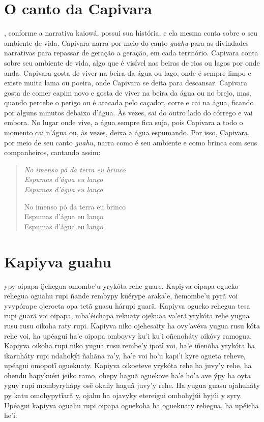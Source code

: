 \chapter{O canto da Capivara}

, conforme a narrativa kaiowá, possui sua história, e ela mesma
conta sobre o seu ambiente de vida. Capivara narra por meio do canto
\emph{guahu} para as divindades narrativas para repassar de geração a
geração, em cada território. Capivara conta sobre seu ambiente de vida,
algo que é visível nas beiras de rios ou lagos por onde anda. Capivara
gosta de viver na beira da água ou lago, onde é sempre limpo e existe
muita lama ou poeira, onde Capivara se deita para descansar. Capivara
gosta de comer capim novo e gosta de viver na beira da água ou no brejo,
mas, quando percebe o perigo ou é atacada pelo caçador, corre e cai na
água, ficando por alguns minutos debaixo d'água. Às vezes, sai do outro
lado do córrego e vai embora. No lugar onde vive, a água sempre fica
suja, pois Capivara a todo o momento cai n'água ou, às vezes, deixa a
água espumando. Por isso, Capivara, por meio de seu canto \emph{guahu},
narra como é seu ambiente e como brinca com seus companheiros, cantando
assim:

\begin{verse}
\itshape
No imenso pó da terra eu brinco\\
Espumas d'água eu lanço\\
Espumas d'água eu lanço

No imenso pó da terra eu brinco\\
Espumas d'água eu lanço\\
Espumas d'água eu lanço
\end{verse}

\chapter{Kapiyva guahu}

 ypy oipapa ijehegua omombe'u yrykóta rehe guare. Kapiyva oipapa
ogueko rehegua oguahu rupi ñande rembypy kuérype araka'e, ñemombe'u pyrã
voi yvypórape ojeroeta opa tetã guasu hárupi guarã. Kapiyva ogueko
rehegua tesa rupi guarã voi oipapa, mba'éichapa rekuaty ojekuaa va'erã
yrykóta rehe yugua rusu rusu oikoha raty rupi. Kapiyva niko ojehesaity
ha ovy'avéva yugua rusu kóta rehe voi, ha upéagui ha'e oipapa omboyvy
ku'i ku'i oñenoháty oikóvy ramogua. Kapiyva oikoha rupi niko yugua rusu
rembe'y ipotῖ voi, ha'e iñenõha yrykóta ha ikaruháty rupi ndahokýi
ñahãna ra'y, ha'e voi ho'u kapi'i kyre ogueta reheve, upéagui omopotῖ
oguekuaty. Kapiyva oikoeteve yrykóta rehe ha juvy'y rehe, ha ohendu
hapykuéri jeiko ramo, ohepy haguã oguekove ha'e ho'a ave ýpy ha oyta
yguy rupi mombyryhápy osẽ okañy haguã juvy'y rehe. Ha yugua guasu
ojahuháty py katu omohypytĩarã y, ojahu ha ojavyky etereígui ombohyjúi
hyjúi y syry. Upéagui kapiyva oguahu rupi oipapa oguekoha ha oguekuaty
rehegua, ha upéicha he'i:

